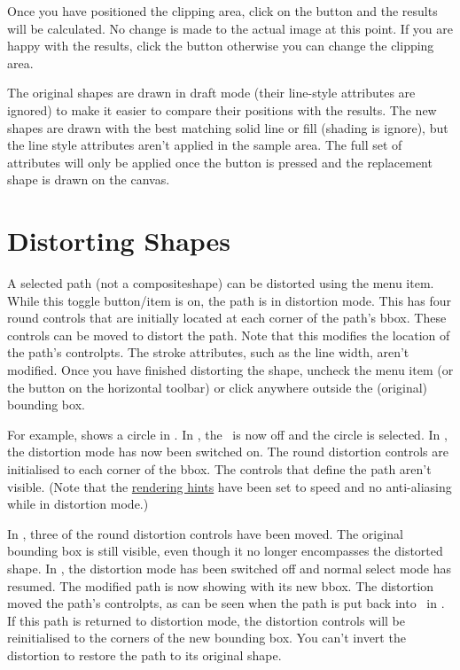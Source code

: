 
Once you have positioned the clipping area, click on the
 button and the results will be calculated.
No change is made to the actual image at this point. If you are
happy with the results, click the  button otherwise you
can change the clipping area.

The original shapes are drawn in draft mode (their \gls{line-style}
attributes are ignored) to make it easier to compare their positions
with the results. The new shapes are drawn with the best matching
solid line or fill  (shading is ignore), 
but the line style attributes aren't applied in the sample area.
The full set of attributes will only be applied once the 
 button is pressed and the replacement shape is drawn on
the \gls{canvas}.

\section{Distorting Shapes}\label{sec:distort}


A selected \gls{path} (not a \gls{compositeshape}) can be distorted using the
 menu item. While this toggle
button\slash item is on, the \gls{path} is in distortion mode.
This has four round controls that are initially located at each
corner of the path's \gls{bbox}. These controls can be moved to
distort the path.  Note that this modifies the location of the
path's \glspl{controlpt}. The stroke attributes, such as the line
width, aren't modified. Once you have finished distorting the shape,
uncheck the  menu item (or the
button on the horizontal \gls{toolbar}) or click
anywhere outside the (original) bounding box.

For example,  shows a circle in 
\editpathmode. In , the \editpathmode\ is now off and
the circle is selected. In , the
distortion mode has now been switched on. The round distortion
controls are initialised to each corner of the \gls{bbox}. The
controls that define the path aren't visible. (Note that the
\hyperref[sec:graphics]{rendering hints} have been set to speed
and no anti-aliasing while in distortion mode.)

In , three of the round distortion
controls have been moved. The original bounding box is still
visible, even though it no longer encompasses the distorted shape.
In , the distortion mode has been
switched off and normal select mode has resumed. The modified path
is now showing with its new \gls{bbox}. The distortion moved the
path's \glspl{controlpt}, as can be seen when the path is put back into
\editpathmode\ in . If this path is
returned to distortion mode, the distortion controls will be reinitialised to
the corners of the new bounding box. You can't invert the distortion
to restore the path to its original shape.

